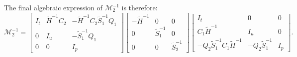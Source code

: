 \documentclass[3p,times]{elsarticle}
\theoremstyle{plain}
\newcommand{\Mat}[1]{#1}
\newcommand{\tS}{\widetilde{S}}
\newcommand{\tH}{\widetilde{H}}
\begin{document}
The final algebraic expression of $\mathcal{M}_2^{-1}$ is therefore:
\begin{equation}
    \mathcal{M}_2^{-1} = \left[ \begin{array}{ccc}
    I_t & \tH^{-1}C_2 & -\tH^{-1} C_2 \tS_1^{-1} Q_1 \\
    0 & I_u & -\tS_1^{-1} Q_1 \\
    0 & 0 & I_p \end{array} \right]
    \left[ \begin{array}{ccc}
    -\tH^{-1} & 0 & 0 \\
    0 & \tS_1^{-1} & 0 \\
    0 & 0 & \tS_2^{-1} \end{array} \right]
    \left[ \begin{array}{ccc}
    I_t & 0 & 0 \\
    C_1 \tH^{-1} & I_u & 0 \\
    -Q_2 \tS_1^{-1} C_1 \tH^{-1} & -Q_2 \tS_1^{-1} & I_p \end{array} \right].
    \label{eq:P2}
\end{equation}
\end{document}
